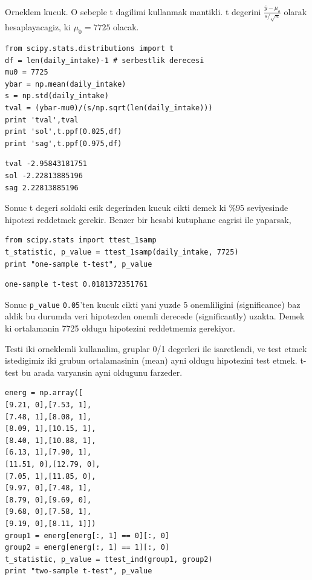\documentclass[12pt,fleqn]{article}\usepackage{../common}
\begin{document}
Orneklem kucuk. O sebeple t dagilimi kullanmak mantikli. t degerini
$\frac{\bar{y}-\mu_o}{s/\sqrt{n}}$ olarak hesaplayacagiz, ki $\mu_0=7725$ olacak.

\begin{verbatim}
from scipy.stats.distributions import t
df = len(daily_intake)-1 # serbestlik derecesi
mu0 = 7725
ybar = np.mean(daily_intake)
s = np.std(daily_intake)
tval = (ybar-mu0)/(s/np.sqrt(len(daily_intake)))
print 'tval',tval
print 'sol',t.ppf(0.025,df)
print 'sag',t.ppf(0.975,df)
\end{verbatim}

\begin{verbatim}
tval -2.95843181751
sol -2.22813885196
sag 2.22813885196
\end{verbatim}

Sonuc t degeri soldaki esik degerinden kucuk cikti demek ki \%95
seviyesinde hipotezi reddetmek gerekir. Benzer bir hesabi kutuphane cagrisi
ile yaparsak,

\begin{verbatim}
from scipy.stats import ttest_1samp
t_statistic, p_value = ttest_1samp(daily_intake, 7725)
print "one-sample t-test", p_value
\end{verbatim}

\begin{verbatim}
one-sample t-test 0.0181372351761
\end{verbatim}

Sonuc \verb!p_value! \verb!0.05!'ten kucuk cikti yani yuzde 5 onemliligini
(significance) baz aldik bu durumda veri hipotezden onemli derecede
(significantly) uzakta. Demek ki ortalamanin 7725 oldugu hipotezini
reddetmemiz gerekiyor.

Testi iki orneklemli kullanalim, gruplar 0/1 degerleri ile
isaretlendi, ve test etmek istedigimiz iki grubun ortalamasinin (mean)
ayni oldugu hipotezini test etmek. t-test bu arada varyansin ayni
oldugunu farzeder.

\begin{verbatim}
energ = np.array([
[9.21, 0],[7.53, 1],
[7.48, 1],[8.08, 1],
[8.09, 1],[10.15, 1],
[8.40, 1],[10.88, 1],
[6.13, 1],[7.90, 1],
[11.51, 0],[12.79, 0],
[7.05, 1],[11.85, 0],
[9.97, 0],[7.48, 1],
[8.79, 0],[9.69, 0],
[9.68, 0],[7.58, 1],
[9.19, 0],[8.11, 1]])
group1 = energ[energ[:, 1] == 0][:, 0]
group2 = energ[energ[:, 1] == 1][:, 0]
t_statistic, p_value = ttest_ind(group1, group2)
print "two-sample t-test", p_value
\end{verbatim}
\end{document}
